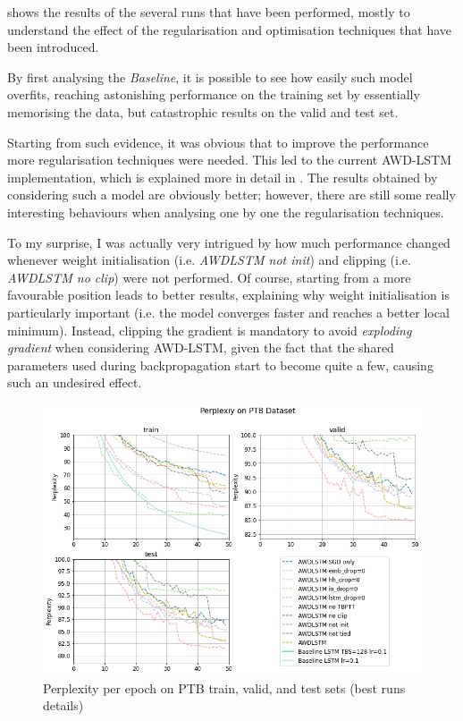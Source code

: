  shows the results of the several runs that have been performed, mostly to understand the effect of the regularisation and optimisation techniques that have been introduced.

By first analysing the \textit{Baseline}, it is possible to see how easily such model overfits, reaching astonishing performance on the training set by essentially memorising the data, but catastrophic results on the valid and test set.

Starting from such evidence, it was obvious that to improve the performance more regularisation techniques were needed. This led to the current AWD-LSTM implementation, which is explained more in detail in . The results obtained by considering such a model are obviously better; however, there are still some really interesting behaviours when analysing one by one the regularisation techniques.

To my surprise, I was actually very intrigued by how much performance changed whenever weight initialisation (i.e. \textit{AWDLSTM not init}) and clipping (i.e. \textit{AWDLSTM no clip}) were not performed. Of course, starting from a more favourable position leads to better results, explaining why weight initialisation is particularly important (i.e. the model converges faster and reaches a better local minimum). Instead, clipping the gradient is mandatory to avoid \textit{exploding gradient} when considering AWD-LSTM, given the fact that the shared parameters used during backpropagation start to become quite a few, causing such an undesired effect.

\begin{figure}
    \centering
    \includegraphics[scale=0.28]{assets/run_results_zoom_in.png}
    \vspace{-1.5em}
    \caption{Perplexity per epoch on PTB train, valid, and test sets (best runs details)}
    \vspace{-1.5em}
    \label{fig:results-zoom}
\end{figure}

